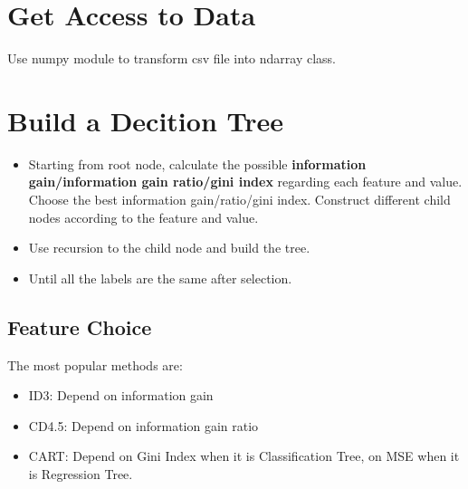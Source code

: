 \documentclass[50pt]{article}
\begin{document}
\section{Get Access to Data}
     Use numpy module to transform csv file into ndarray class.
\section{Build a Decition Tree}
\begin{itemize}
    \item Starting from root node, calculate the possible \textbf{information gain/information gain
    ratio/gini index} regarding each feature
    and value. Choose the best information gain/ratio/gini index. Construct different child nodes according to 
    the feature and value.
    \item Use recursion to the child node and build the tree.
    \item Until all the labels are the same after selection.
\end{itemize}

\subsection{Feature Choice}
The most popular methods are:
\begin{itemize}
    \item ID3: Depend on information gain
    \item CD4.5: Depend on information gain ratio
    \item CART: Depend on Gini Index when it is Classification Tree, on MSE when it is Regression Tree.
\end{itemize}
\end{document}
